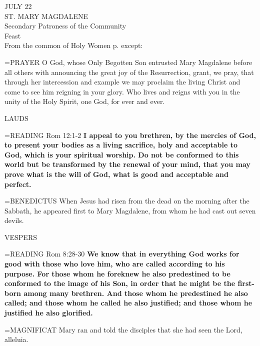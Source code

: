 \begin{center}\normalsize JULY 22\\
\footnotesize ST. MARY MAGDALENE\\
\footnotesize Secondary Patroness of the Community\\
\footnotesize Feast\\
\footnotesize From the common of Holy Women p.     except:\\
\end{center}

\hangindent=\parindent \small{PRAYER 
O God, whose Only Begotten Son
entrusted Mary Magdalene before all others
with announcing the great joy of the Resurrection,
grant, we pray,
that through her intercession and example
we may proclaim the living Christ
and come to see him reigning in your glory.
Who lives and reigns with you in the unity of the Holy Spirit,
one God, for ever and ever.\\}
 
\begin{flushleft}\normalsize LAUDS\\\end{flushleft}

\hangindent=\parindent \small{READING} Rom 12:1-2 \textbf{I appeal to you brethren, by the mercies of God,
to present your bodies as a living sacrifice, holy and acceptable to
God, which is your spiritual worship. Do not be conformed to this
world but be transformed by the renewal of your mind, that you
may prove what is the will of God, what is good and acceptable
and perfect.\\}
 
\hangindent=\parindent \small{BENEDICTUS  When Jesus had risen from the dead on the morning
after the Sabbath, he appeared first to Mary Magdalene, from whom
he had cast out seven devils.\\}
 
\begin{flushleft}\normalsize VESPERS\\\end{flushleft}

\hangindent=\parindent \small{READING} Rom 8:28-30 \textbf{We know that in everything God works for
good with those who love him, who are called according to his
purpose. For those whom he foreknew he also predestined to be
conformed to the image of his Son, in order that he might be the
first-born among many brethren. And those whom he predestined
he also called; and those whom he called he also justified; and those
whom he justified he also glorified.\\}
 
\hangindent=\parindent \small{MAGNIFICAT  Mary ran and told the disciples that she had seen the
Lord, alleluia.\\}
 
